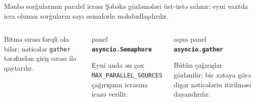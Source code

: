\documentclass[aspectratio=169,11pt]{beamer}
\newenvironment{panel}{\begin{beamercolorbox}[wd=\linewidth,sep=1.2ex,rounded=true]{panel}}{\end{beamercolorbox}}
\newenvironment{aquapanel}{\begin{beamercolorbox}[wd=\linewidth,sep=1.2ex,rounded=true]{aqua panel}}{\end{beamercolorbox}}
\newcommand{\lead}[1]{{\color{muted}\normalsize #1}\par\vspace{0.75em}}
\newcommand{\speaker}{ii1ahe}
\begin{document}
\renewcommand{\speaker}{Elmin995}
\begin{frame}{Mənbə sorğularının paralel icrası}
  \lead{Şəbəkə gözləmələri üst-üstə salınır; eyni vaxtda icra olunan sorğuların sayı semaforla məhdudlaşdırılır.}
  \begin{columns}[T,onlytextwidth]
      \par
      \vspace{1mm}
      \small Bitmə sırası fərqli ola bilər; nəticələr \texttt{gather} tərəfindən giriş sırası ilə qaytarılır.
      \begin{panel}
        \small\textbf{\texttt{asyncio.Semaphore}}\par
        Eyni anda ən çox \texttt{MAX\_PARALLEL\_SOURCES} çağırışının icrasına icazə verilir.
      \end{panel}
      \vspace{2mm}
      \begin{aquapanel}
        \small\textbf{\texttt{asyncio.gather}}\par
        Bütün çağırışlar gözlənilir; bir xətaya görə digər nəticələrin itirilməsi dayandırılır.
      \end{aquapanel}
  \end{columns}
\end{frame}
\end{document}
